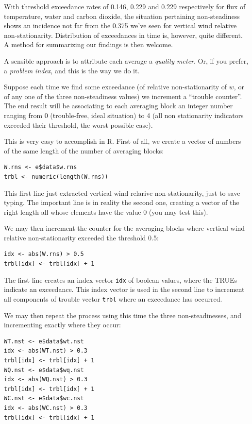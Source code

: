 \documentclass[a4paper,10pt]{book}
\begin{document}
With threshold exceedance rates of 0.146, 0.229 and 0.229 respectively for flux of temperature, water and carbon dioxide, the situation pertaining non-steadiness shows an incidence not far from the 0.375 we've seen for vertical wind relative non-stationarity. Distribution of exceedances in time is, however, quite different. A method for summarizing our findings is then welcome.

A sensible approach is to attribute each average a \emph{quality meter}. Or, if you prefer, a \emph{problem index}, and this is the way we do it.

Suppose each time we find some exceedance (of relative non-stationarity of $w$, or of any one of the three non-steadiness values) we increment a ``trouble counter''. The end result will be associating to each averaging block an integer number ranging from 0 (trouble-free, ideal situation) to 4 (all non stationarity indicators exceeded their threshold, the worst possible case).

This is very easy to accomplish in R. First of all, we create a vector of numbers of the same length of the number of averaging blocks:

\begin{verbatim}
W.rns <- e$data$w.rns
trbl <- numeric(length(W.rns))
\end{verbatim}

This first line just extracted vertical wind relarive non-stationarity, just to save typing. The important line is in reality the second one, creating a vector of the right length all whose elements have the value 0 (you may test this).

We may then increment the counter for the averaging blocks where vertical wind relative non-stationarity exceeded the threshold 0.5:

\begin{verbatim}
idx <- abs(W.rns) > 0.5
trbl[idx] <- trbl[idx] + 1
\end{verbatim}

The first line creates an index vector \verb|idx| of boolean values, where the TRUEs indicate an exceedance. This index vector is used in the second line to increment all components of trouble vector \verb|trbl| where an exceedance has occurred.

We may then repeat the process using this time the three non-steadinesses, and incrementing exactly where they occur:

\begin{verbatim}
WT.nst <- e$data$wt.nst
idx <- abs(WT.nst) > 0.3
trbl[idx] <- trbl[idx] + 1
WQ.nst <- e$data$wq.nst
idx <- abs(WQ.nst) > 0.3
trbl[idx] <- trbl[idx] + 1
WC.nst <- e$data$wc.nst
idx <- abs(WC.nst) > 0.3
trbl[idx] <- trbl[idx] + 1
\end{verbatim}
\end{document}
